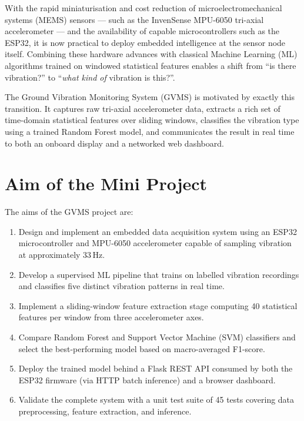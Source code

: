 \documentclass[12pt,a4paper]{report}
\begin{document}
With the rapid miniaturisation and cost reduction of microelectromechanical
systems (MEMS) sensors --- such as the InvenSense MPU-6050 tri-axial
accelerometer --- and the availability of capable microcontrollers such as the
ESP32, it is now practical to deploy embedded intelligence at the sensor
node itself. Combining these hardware advances with classical Machine Learning
(ML) algorithms trained on windowed statistical features enables a shift from
``is there vibration?'' to ``\emph{what kind of} vibration is this?''.

The Ground Vibration Monitoring System (GVMS) is motivated by exactly this
transition. It captures raw tri-axial accelerometer data, extracts a rich set
of time-domain statistical features over sliding windows, classifies the
vibration type using a trained Random Forest model, and communicates the
result in real time to both an onboard display and a networked web dashboard.

\section{Aim of the Mini Project}

The aims of the GVMS project are:

\begin{enumerate}[leftmargin=2cm]
  \item Design and implement an embedded data acquisition system using an
        ESP32 microcontroller and MPU-6050 accelerometer capable of sampling
        vibration at approximately 33\,Hz.
  \item Develop a supervised ML pipeline that trains on labelled vibration
        recordings and classifies five distinct vibration patterns in real time.
  \item Implement a sliding-window feature extraction stage computing 40
        statistical features per window from three accelerometer axes.
  \item Compare Random Forest and Support Vector Machine (SVM) classifiers
        and select the best-performing model based on macro-averaged F1-score.
  \item Deploy the trained model behind a Flask REST API consumed by both
        the ESP32 firmware (via HTTP batch inference) and a browser dashboard.
  \item Validate the complete system with a unit test suite of 45 tests
        covering data preprocessing, feature extraction, and inference.
\end{enumerate}
\end{document}
